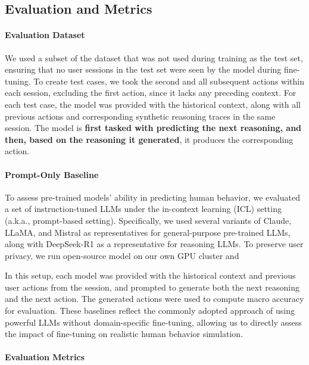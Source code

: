 \documentclass{article} %
\DeclareRobustCommand{\note}[1]{{\sethlcolor{orange!30!white}\hl{#1}}}
\begin{document}
\subsection{Evaluation and Metrics}

\paragraph{Evaluation Dataset}  

We used a subset of the dataset that was not used during training as the test set, ensuring that no user sessions in the test set were seen by the model during fine-tuning.
To create test cases, we took the second and all subsequent actions within each session, excluding the first action, since it lacks any preceding context.
For each test case, the model was provided with the historical context, along with all previous actions and corresponding synthetic reasoning traces in the same session.
The model is \textbf{first tasked with predicting the next reasoning, and then, based on the reasoning it generated}, it produces the corresponding action.

\paragraph{Prompt-Only Baseline}
To assess pre-trained models' ability in predicting human behavior, we evaluated a set of instruction-tuned LLMs under the in-context learning (ICL) setting (a.k.a., prompt-based setting). Specifically, we used several variants of Claude, LLaMA, and Mistral as representatives for general-purpose pre-trained LLMs, along with DeepSeek-R1 as a representative for reasoning LLMs.
To preserve user privacy, we run open-source model on our own GPU cluster and 

In this setup, each model was provided with the historical context and previous user actions from the session, and prompted to generate both the next reasoning and the next action.
The generated actions were used to compute macro accuracy for evaluation. 
These baselines reflect the commonly adopted approach of using powerful LLMs without domain-specific fine-tuning, allowing us to directly assess the impact of fine-tuning on realistic human behavior simulation.



\paragraph{Evaluation Metrics}  
\end{document}
